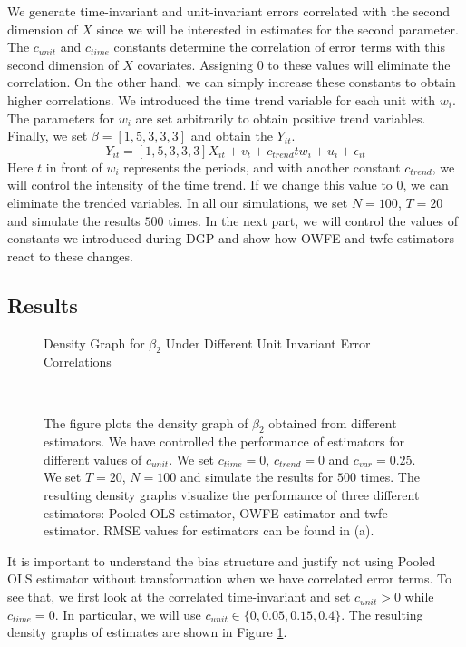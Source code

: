 \documentclass[12pt, a4paper]{article}
\begin{document}
We generate time-invariant and unit-invariant errors correlated with the
second dimension of $X$ since we will be interested in estimates
for the second parameter. The $c_{unit}$ and $c_{time}$ constants determine
the correlation of error terms with this second dimension of $X$ covariates.
Assigning $0$ to these values will eliminate the correlation.
On the other hand, we can simply increase these constants to obtain higher correlations.
We introduced the time trend variable for each unit with $w_{i}$. The parameters for $w_{i}$ are
set arbitrarily to obtain positive trend variables. Finally, we set $\beta = [1, 5, 3, 3, 3]$
and obtain the $Y_{it}$.
$$Y_{it} = [1, 5, 3, 3, 3] X_{it} + v_{t} + c_{trend} t w_{i} + u_{i} + \epsilon_{it} $$
Here $t$ in front of $w_i$ represents the periods, and with another constant $c_{trend}$, we will control the intensity of the time trend. If we change this value to $0$, we can eliminate the trended variables. In all our simulations, we set $N = 100$, $T = 20$ and simulate the results $500$ times. In the next part, we will control the values of constants we introduced during DGP and show how \ac{OWFE} and
\ac{twfe} estimators react to these changes.

\subsection{Results}
\begin{figure}[htbp]
    \caption{Density Graph for $ \beta_2$ Under Different Unit Invariant Error Correlations}
     \\
    \caption*{\scriptsize{The figure plots the density graph of $\beta_2$
    obtained from different estimators. We have controlled the performance of
    estimators for different values of $c_{unit}$. We set $c_{time} = 0$, $c_{trend} = 0$
    and $c_{var} = 0.25$. We set $T = 20$, $N = 100$ and simulate the results
    for $500$ times. The resulting density graphs visualize the performance
    of three different estimators: Pooled OLS estimator, \ac{OWFE} estimator and  \ac{twfe} estimator.
    RMSE values for estimators can be found in  (a).
    \label{fig:c1}
    }}
\end{figure}
It is important to understand the bias structure and justify not using Pooled OLS
estimator without transformation when we have correlated error terms. To see that,
we first look at the correlated time-invariant and set $c_{unit} > 0$ while
$c_{time} = 0$. In particular, we will use $c_{unit} \in \{0, 0.05, 0.15, 0.4\}$.
The resulting density graphs of estimates are shown in Figure \ref{fig:c1}.
\end{document}
